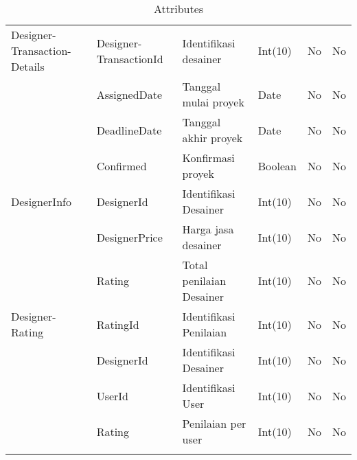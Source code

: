 \begin{longtable}{| p{2.2cm} | p{2.5cm} | p{3.4cm} | p{2.2cm} | l | p{1.3cm} |}
		Designer-Transaction-Details	& Designer-TransactionId	& Identifikasi desainer	& Int(10)	& No & No \\
									& AssignedDate			& Tanggal mulai proyek	& Date		& No & No \\
									& DeadlineDate			& Tanggal akhir proyek	& Date		& No & No \\
									& Confirmed				& Konfirmasi proyek		& Boolean	& No & No \\ \hline
									
		DesignerInfo	& DesignerId	& Identifikasi Desainer		& Int(10)	& No & No \\
						& DesignerPrice	& Harga jasa desainer		& Int(10)	& No & No \\
						& Rating		& Total penilaian Desainer	& Int(10)	& No & No \\ \hline
						
		Designer-Rating	& RatingId		& Identifikasi Penilaian	& Int(10)	& No & No \\
						& DesignerId	& Identifikasi Desainer		& Int(10)	& No & No \\
						& UserId		& Identifikasi User			& Int(10)	& No & No \\
						& Rating		& Penilaian per user		& Int(10)	& No & No \\ \hline
		
		\caption{Attributes}
	\end{longtable}
